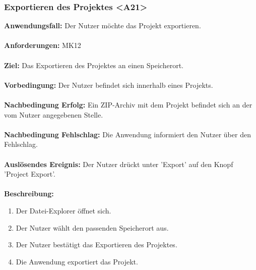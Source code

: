 \documentclass[parskip=full]{scrartcl} %
\begin{document}
\subsubsection*{Exportieren des Projektes <A21>}
\textbf{Anwendungsfall:} Der Nutzer möchte das Projekt exportieren. \\\\
\textbf{Anforderungen:} MK12\\\\
\textbf{Ziel:} Das Exportieren des Projektes an einen Speicherort.\\\\
\textbf{Vorbedingung:} Der Nutzer befindet sich innerhalb eines Projekts.\\\\
\textbf{Nachbedingung Erfolg:} Ein ZIP-Archiv mit dem Projekt befindet sich an der vom Nutzer angegebenen Stelle.\\\\
\textbf{Nachbedingung Fehlschlag:} Die Anwendung informiert den Nutzer über den Fehlschlag.\\\\
\textbf{Auslösendes Ereignis:}  Der Nutzer drückt unter 'Export' auf den Knopf 'Project Export'. \\\\
\textbf{Beschreibung:}
\begin{enumerate}
    \item Der Datei-Explorer öffnet sich.
    \item Der Nutzer wählt den passenden Speicherort aus.
    \item Der Nutzer bestätigt das Exportieren des Projektes.
    \item Die Anwendung exportiert das Projekt.
\end{enumerate}
\newpage
\end{document}
